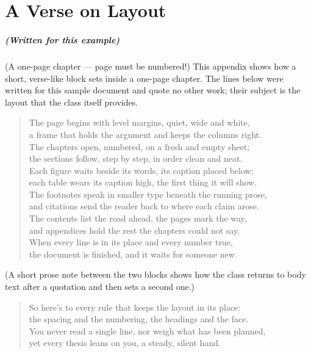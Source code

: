 \chapter{A Verse on Layout}	\OnePageChapter         %

\noindent\paragraph{(Written for this example)}
(A one-page chapter --- page must be numbered!)
This appendix shows how a short, verse-like block sets
inside a one-page chapter. The lines below were written
for this sample document and quote no other work; their
subject is the layout that the class itself provides.


\begin{quotation}
\noindent The page begins with level margins, quiet, wide and white, \\
a frame that holds the argument and keeps the columns right. \\
The chapters open, numbered, on a fresh and empty sheet; \\
the sections follow, step by step, in order clean and neat. \\
Each figure waits beside its words, its caption placed below; \\
each table wears its caption high, the first thing it will show. \\
The footnotes speak in smaller type beneath the running prose, \\
and citations send the reader back to where each claim arose. \\
The contents list the road ahead, the pages mark the way, \\
and appendices hold the rest the chapters could not say. \\
When every line is in its place and every number true, \\
the document is finished, and it waits for someone new.
\end{quotation}


\noindent(A short prose note between the two blocks shows how
the class returns to body text after a quotation and then
sets a second one.)


\begin{quotation}
\noindent So here's to every rule that keeps the layout in its place: \\
the spacing and the numbering, the headings and the face. \\
You never read a single line, nor weigh what has been planned, \\
yet every thesis leans on you, a steady, silent hand.
\end{quotation}
